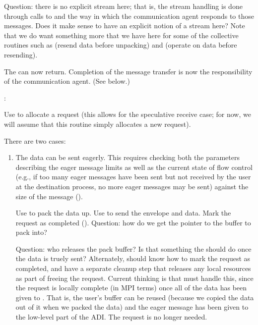 \begin{mmadi}
\begin{tcp}
\begin{enumerate}
\begin{enumerate}
  Question: there is no explicit stream here; that is, the stream handling is
  done through calls to  and the way in which the
  communication agent responds to those messages.  Does it make sense to have
  an explicit notion of a stream here?  Note that we do want something more
  that we have here for some of the collective routines such as
   (resend data before unpacking) and
   (operate on data before resending).

  The  can now return.  Completion of the message transfer
  is now the responsibility of the communication agent.  (See below.)

\end{enumerate}

\end{enumerate}
:

Use  to allocate a request (this allows for
the speculative receive case; for now, we will assume that this routine simply
allocates a new request).  

There are two cases:
\begin{enumerate}
\item The data can be sent eagerly.  This requires checking both the
  parameters describing the eager message limits as well as the current state
  of flow control (e.g., if too many eager messages have been sent but not
  received by the user at the destination process, no more eager messages may
  be sent) against the size of the message ().

Use  to pack the data up.  Use  to
send the envelope and data.  Mark the request as completed
(). 
Question: how do we get the pointer to the buffer to pack into?

Question: who releases the pack buffer?  Is that something the
 should do once the data is truely sent?  Alternately,
should  know how to mark the request as completed, and
have a separate cleanup step that releases any local resources as part of
freeing the request.  Current thinking is that  must
handle this, since the request is locally complete (in MPI terms) once all of
the data has 
been given to .  That is, the user's buffer can be reused
(because we copied the data out of it when we packed the data) and the eager
message has been given to 
the low-level part of the ADI.  The request is no longer needed.  


\end{enumerate}
\end{tcp}
\end{mmadi}
